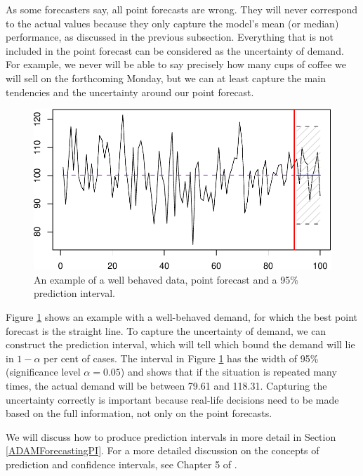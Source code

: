 \documentclass[]{book}
\theoremstyle{definition}
\theoremstyle{definition}
\theoremstyle{definition}
\theoremstyle{definition}
\theoremstyle{remark}
\begin{document}
As some forecasters say, all point forecasts are wrong. They will never correspond to the actual values because they only capture the model's mean (or median) performance, as discussed in the previous subsection. Everything that is not included in the point forecast can be considered as the uncertainty of demand. For example, we never will be able to say precisely how many cups of coffee we will sell on the forthcoming Monday, but we can at least capture the main tendencies and the uncertainty around our point forecast.

\begin{figure}
\centering
\includegraphics{Svetunkov--2022----ADAM_files/figure-latex/adamExampleNormal-1.pdf}
\caption{\label{fig:adamExampleNormal}An example of a well behaved data, point forecast and a 95\% prediction interval.}
\end{figure}

Figure \ref{fig:adamExampleNormal} shows an example with a well-behaved demand, for which the best point forecast is the straight line. To capture the uncertainty of demand, we can construct the prediction interval, which will tell which bound the demand will lie in \(1-\alpha\) per cent of cases. The interval in Figure \ref{fig:adamExampleNormal} has the width of 95\% (significance level \(\alpha=0.05\)) and shows that if the situation is repeated many times, the actual demand will be between 79.61 and 118.31. Capturing the uncertainty correctly is important because real-life decisions need to be made based on the full information, not only on the point forecasts.

We will discuss how to produce prediction intervals in more detail in Section \ref{ADAMForecastingPI}. For a more detailed discussion on the concepts of prediction and confidence intervals, see Chapter 5 of \citet{SvetunkovSBA}.
\end{document}
